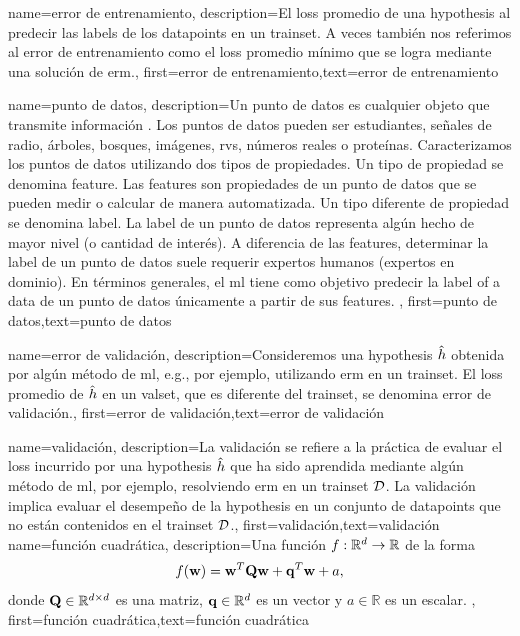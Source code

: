  {
	 name={error de entrenamiento},
	 description={El \gls{loss} promedio de una \gls{hypothesis} al 
		 predecir las \gls{label}s de los \gls{datapoint}s en un \gls{trainset}. 
		 A veces también nos referimos al error de entrenamiento como el \gls{loss} promedio mínimo 
		 que se logra mediante una solución de \gls{erm}.},
		 first={error de entrenamiento},text={error de entrenamiento}  
 }

{name={punto de datos},
description={Un punto de datos es cualquier objeto que transmite información \cite{coverthomas}.
		Los puntos de datos pueden ser estudiantes, señales de radio, árboles, bosques, imágenes, \gls{rv}s, números reales o proteínas.
		Caracterizamos los puntos de datos utilizando dos tipos de propiedades. Un tipo de propiedad se denomina \gls{feature}. 
		Las \Gls{feature}s son propiedades de un punto de datos que se pueden medir o calcular de manera automatizada.  
		Un tipo diferente de propiedad se denomina \gls{label}. La \gls{label} de un punto de datos representa 
		algún hecho de mayor nivel (o cantidad de interés). A diferencia de las \gls{feature}s, determinar la \gls{label} de un punto de datos suele requerir expertos humanos (expertos en dominio). 
		En términos generales, el \gls{ml} tiene como objetivo predecir la
		\gls{label} of a \gls{data} de un punto de datos únicamente a partir de sus  \gls{feature}s. 
		}, first={punto de datos},text={punto de datos}  
}


{name={error de validación},
 description={Consideremos una \gls{hypothesis} $\hat{h}$ obtenida por algún método de
 	\gls{ml}, e.g., por ejemplo, utilizando \gls{erm} en un \gls{trainset}. El \gls{loss} promedio de
 	$\hat{h}$ en un \gls{valset}, que es diferente del \gls{trainset},  se denomina error de validación.},
	first={error de validación},text={error de validación}  
}

{
	name={validación},
	description={La validación se refiere a la práctica de evaluar el \gls{loss} incurrido por una 
		\gls{hypothesis} $\hat{h}$ que ha sido aprendida mediante algún método de \gls{ml}, 
		por ejemplo, resolviendo \gls{erm} en un \gls{trainset} $\mathcal{D}$. La validación implica evaluar 
		el desempeño de la \gls{hypothesis} en un conjunto de \gls{datapoint}s que no están contenidos 
		en el \gls{trainset} $\mathcal{D}$.}, 
	first={validación},text={validación}  
}
{name={función cuadrática},
	description={Una función $f: \mathbb{R}^{d} \rightarrow \mathbb{R}$ de la forma
	$$f({\bf w}) =  {\bf w}^{T} \mathbf{Q} \mathbf{w} + \mathbf{q}^{T} {\bf w}+a,$$ donde 
	$\mathbf{Q} \in \mathbb{R}^{d \times d}$ es una matriz, ${\bf q} \in \mathbb{R}^{d}$ es un vector
	y $a \in \mathbb{R}$ es un escalar. },
	first={función cuadrática},text={función cuadrática}  
}

